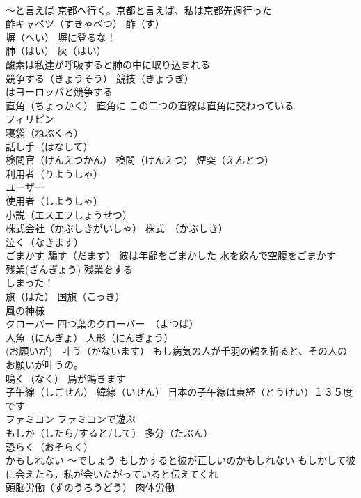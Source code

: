 \documentclass[8pt]{extreport}
\begin{document}
\begin{CJK}{UTF8}{min}
\\	～と言えば 京都へ行く。京都と言えば、私は京都先週行った
\\	酢キャベツ（すきゃべつ） 酢（す）
\\	塀（へい） 塀に登るな！
\\	肺（はい） 灰（はい）
\\	酸素は私達が呼吸すると肺の中に取り込まれる
\\	競争する（きょうそう） 競技（きょうぎ）
\\	はヨーロッパと競争する
\\	直角（ちょっかく） 直角に この二つの直線は直角に交わっている
\\	フィリピン
\\	寝袋（ねぶくろ）
\\	話し手（はなして）
\\	検閲官（けんえつかん） 検閲（けんえつ） 煙突（えんとつ）
\\	利用者（りようしゃ）
\\	ユーザー 
\\	使用者（しようしゃ）
\\	小説（エスエフしょうせつ）
\\	株式会社（かぶしきがいしゃ） 株式　（かぶしき）
\\	泣く（なきます）
\\	ごまかす 騙す（だます） 彼は年齢をごまかした 水を飲んで空腹をごまかす
\\	残業(ざんぎょう) 残業をする
\\	しまった！
\\	旗（はた） 国旗（こっき）
\\	風の神様
\\	クローバー 四つ葉のクローバー　（よつば）
\\	人魚（にんぎょ） 人形（にんぎょう）
\\	(お願いが)　叶う（かないます） もし病気の人が千羽の鶴を折ると、その人のお願いが叶うの。
\\	鳴く（なく） 鳥が鳴きます
\\	子午線（しごせん） 緯線（いせん） 日本の子午線は東経（とうけい）１３５度です
\\	ファミコン ファミコンで遊ぶ
\\	もしか（したら/すると/して） 多分（たぶん）
\\	恐らく（おそらく）
\\	かもしれない ～でしょう もしかすると彼が正しいのかもしれない もしかして彼に会えたら，私が会いたがっていると伝えてくれ
\\	頭脳労働（ずのうろうどう） 肉体労働

\end{CJK}
\end{document}
